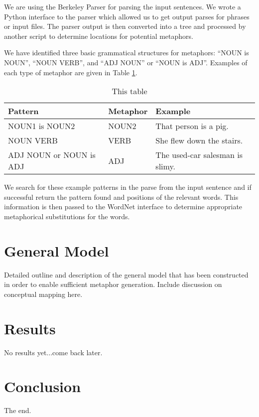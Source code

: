 \documentclass[12pt]{article}
\begin{document}
We are using the Berkeley Parser for parsing the input sentences.  We wrote a Python interface to the parser which allowed us to get output parses for phrases or input files.  The parser output is then converted into a tree and processed by another script to determine locations for potential metaphors.

We have identified three basic grammatical structures for metaphors: ``NOUN is NOUN'', ``NOUN VERB'', and ``ADJ NOUN'' or ``NOUN is ADJ''.  Examples of each type of metaphor are given in Table \ref{tab:metaphorexamples}.

\begin{table}[h]
	\centering
	\small
	\begin{tabular}{|l|l|l|} \hline
		Pattern & Metaphor & Example\\	\hline
		NOUN1 is NOUN2 & NOUN2 & That person is a pig.\\ \hline
		NOUN VERB & VERB & She flew down the stairs.\\ \hline
		ADJ NOUN or NOUN is ADJ & ADJ & The used-car salesman is slimy.\\ \hline
	\end{tabular}
	\caption{This table}
	\label{tab:metaphorexamples}
\end{table}

We search for these example patterns in the parse from the input sentence and if successful return the pattern found and positions of the relevant words.  This information is then passed to the WordNet interface to determine appropriate metaphorical substitutions for the words.

\section{General Model}

Detailed outline and description of the general model that has been constructed in order to enable sufficient metaphor generation. Include discussion on conceptual mapping here.

\section{Results}

No results yet...come back later.

\section{Conclusion}
The end.
\end{document}
